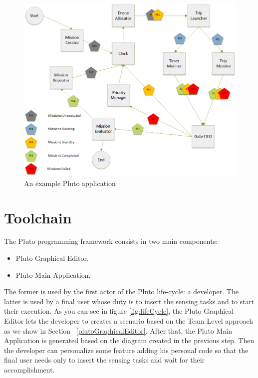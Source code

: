 \begin{figure}[htb]
  \centering
  \includegraphics[width=\linewidth]{pictures/BlocksDiagram.png}
  \caption{An example Pluto application}
  \label{fig:BlocksDiagram}
\end{figure}

\section{Toolchain}\label{toolchain}

The Pluto programming framework consists in two main components:
\begin{itemize}
\item Pluto Graphical Editor.
\item Pluto Main Application.
\end{itemize}
The former is used by the first actor of the Pluto life-cycle: a developer. The latter is used by a final user whose duty is to insert the sensing tasks and to start their execution.
As you can see in figure \ref{fig:lifeCycle}, the Pluto Graphical Editor lets the developer to creates a scenario based on the Team Level approach as we show in Section ~\ref{plutoGraphicalEditor}. After that, the Pluto Main Application is generated based on the diagram created in the previous step. Then the developer can personalize some feature adding his personal code so that the final user needs only to insert the sensing tasks and wait for their accomplishment.

